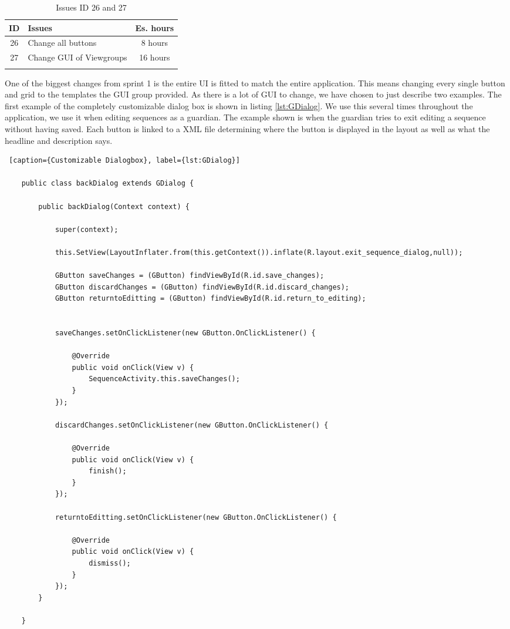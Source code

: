 
\begin{longtable} { | c | p{12cm} | c | } 
\hline
	ID 	&	Issues	&		 Es. hours \\\hline
	26	& 	Change all buttons	&	8 hours	\\\hline
	27	& 	Change GUI of Viewgroups	&	16 hours	\\\hline
\caption{Issues ID 26 and 27}
\label{tab:spr2_GUIchange}
\end{longtable}

One of the biggest changes from sprint 1 is the entire UI is fitted to match the entire application. This means changing every single button and grid to the templates the GUI group provided. As there is a lot of GUI to change, we have chosen to just describe two examples. The first example of the completely customizable dialog box is shown in listing \ref{lst:GDialog}. We use this several times throughout the application, we use it when editing sequences as a guardian. The example shown is when the guardian tries to exit editing a sequence without having saved. Each button is linked to a XML file determining where the button is displayed in the layout as well as what the headline and description says. 

\begin{lstlisting} [caption={Customizable Dialogbox}, label={lst:GDialog}]

    public class backDialog extends GDialog {

        public backDialog(Context context) {

            super(context);

            this.SetView(LayoutInflater.from(this.getContext()).inflate(R.layout.exit_sequence_dialog,null));

            GButton saveChanges = (GButton) findViewById(R.id.save_changes);
            GButton discardChanges = (GButton) findViewById(R.id.discard_changes);
            GButton returntoEditting = (GButton) findViewById(R.id.return_to_editing);


            saveChanges.setOnClickListener(new GButton.OnClickListener() {

                @Override
                public void onClick(View v) {
                    SequenceActivity.this.saveChanges();
                }
            });

            discardChanges.setOnClickListener(new GButton.OnClickListener() {

                @Override
                public void onClick(View v) {
                    finish();
                }
            });

            returntoEditting.setOnClickListener(new GButton.OnClickListener() {

                @Override
                public void onClick(View v) {
                    dismiss();
                }
            });
        }

    }
\end{lstlisting}

